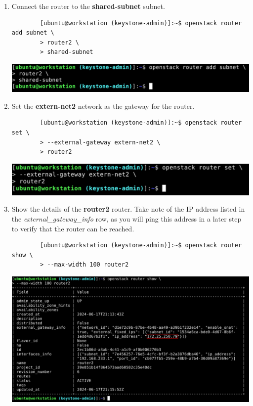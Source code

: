 \documentclass[letterpaper, 12pt]{article}
\begin{document}
\begin{enumerate}
    \item Connect the router to the \textbf{shared-subnet} subnet.
    \begin{lstlisting}
        [ubuntu@workstation (keystone-admin)]:~$ openstack router add subnet \
        > router2 \
        > shared-subnet
    \end{lstlisting}

    \begin{center}
        \includegraphics[width=\linewidth]{images/part2/step13.png}
    \end{center}

    \item Set the \textbf{extern-net2} network as the gateway for the router.
    \begin{lstlisting}
        [ubuntu@workstation (keystone-admin)]:~$ openstack router set \
        > --external-gateway extern-net2 \
        > router2
    \end{lstlisting}

    \begin{center}
        \includegraphics[width=\linewidth]{images/part2/step14.png}
    \end{center}

    \item Show the details of the \textbf{router2} router. Take note of the IP address listed in the
    \textit{external\_gateway\_info} row, as you will ping this address in a later step to verify that the router can be
    reached.
    \begin{lstlisting}
        [ubuntu@workstation (keystone-admin)]:~$ openstack router show \
        > --max-width 100 router2
    \end{lstlisting}

    \begin{center}
        \includegraphics[width=\linewidth]{images/part2/step15.png}
    \end{center}


\end{enumerate}
\end{document}
